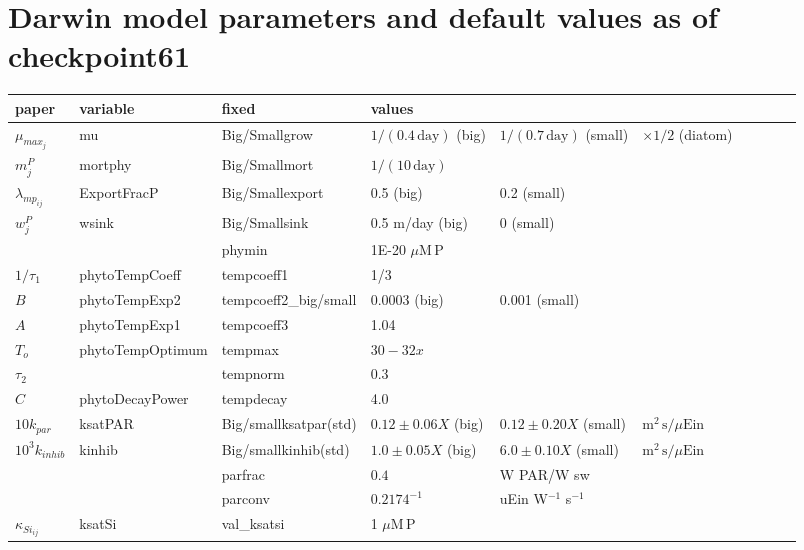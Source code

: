 \documentclass[letterpaper,10pt]{article}
\newcommand{\dy}{\mathrm{day}}
\newcommand{\uM}{\mu\mathrm{M}}
\renewcommand{\P}{\mathrm{P}}
\newcommand{\uEin}{\mu\text{Ein}}
\newcommand{\m}{\mathrm{m}}
\newcommand{\s}{\mathrm{s}}
\begin{document}
\thispagestyle{empty}

\section*{Darwin model parameters and default values as of checkpoint61}

\noindent
\begin{tabular}{llllllllll}
  paper               & variable       & fixed           & values \\\hline
  $\mu_{max_j}$             & mu             & Big/Smallgrow   & $1/(0.4\,\dy)$ (big)  & $1/(0.7\,\dy)$ (small)  & $\times 1/2$ (diatom) \\
  $m^P_j$             & mortphy        & Big/Smallmort   & $1/(10\,\dy)$ \\
  $\lambda_{mp_{ij}}$ & ExportFracP    & Big/Smallexport & 0.5 (big)             & 0.2 (small) \\
  $w^P_j$             & wsink          & Big/Smallsink   & 0.5 m/day (big)       & 0 (small) \\ 
                      &                & phymin          & 1E-20 $\uM\,\P$ \\ 
  \hline                              
  $1/\tau_1$ & phytoTempCoeff   & tempcoeff1            & 1/3 \\ 
  $B$        & phytoTempExp2    & tempcoeff2\_big/small & 0.0003 (big) & 0.001 (small) \\
  $A$        & phytoTempExp1    & tempcoeff3            & 1.04 \\
  $T_o$      & phytoTempOptimum & tempmax               & $30-32x$ \\
  $\tau_2$   &                  & tempnorm              & 0.3 \\
  $C$        & phytoDecayPower  & tempdecay             & 4.0 \\
  \hline                              
  $10 k_{par}$        & ksatPAR        & Big/smallksatpar(std) & $0.12\pm0.06X$ (big) & $0.12\pm0.20X$ (small) & $\m^2\,\s/\uEin$ \\
  $10^3 k_{inhib}$    & kinhib         & Big/smallkinhib(std)  & $1.0\pm0.05X$ (big)  & $6.0\pm0.10X$ (small)  & $\m^2\,\s/\uEin$ \\
                      &                & parfrac               & $0.4$         & W PAR/W sw\\
                      &                & parconv               & $0.2174^{-1}$ & uEin W$^{-1}$ s$^{-1}$ \\
  \hline
  $\kappa_{Si_{ij}}$  & ksatSi  & val\_ksatsi        & 1 $\uM\,\P$ \\

\end{tabular}
\end{document}
